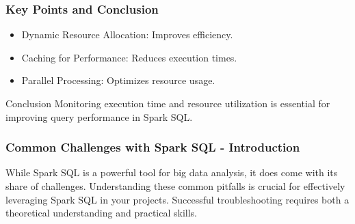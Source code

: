 \documentclass[aspectratio=169]{beamer}
\begin{document}
\begin{frame}[fragile]
    \frametitle{Key Points and Conclusion}
    \begin{itemize}
        \item Dynamic Resource Allocation: Improves efficiency.
        \item Caching for Performance: Reduces execution times.
        \item Parallel Processing: Optimizes resource usage.
    \end{itemize}
    \begin{block}{Conclusion}
        Monitoring execution time and resource utilization is essential for improving query performance in Spark SQL.
    \end{block}
\end{frame}

\begin{frame}[fragile]
    \frametitle{Common Challenges with Spark SQL - Introduction}
    While Spark SQL is a powerful tool for big data analysis, it does come with its share of challenges. Understanding these common pitfalls is crucial for effectively leveraging Spark SQL in your projects. Successful troubleshooting requires both a theoretical understanding and practical skills.
\end{frame}
\end{document}
